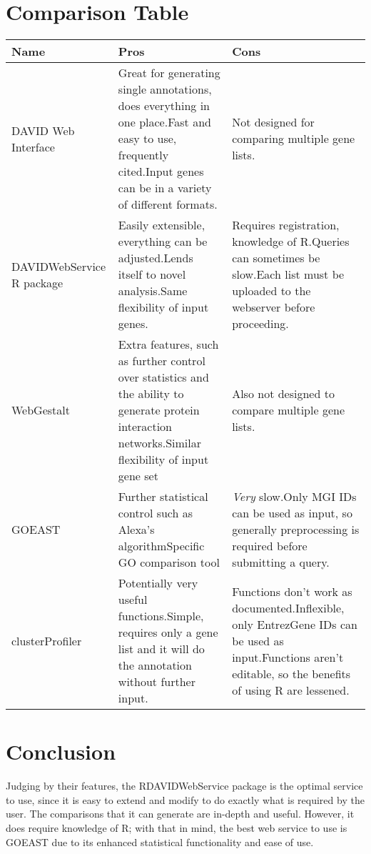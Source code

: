 \documentclass[11pt, oneside]{article}
\begin{document}
\section*{Comparison Table}
\begin{tabular}{ | p{5cm} | p{5cm} | p{5cm} |}
\hline
Name & Pros & Cons \\
\hline
DAVID Web Interface & Great for generating single annotations, does everything in one place.\newline Fast and easy to use, frequently cited.\newline Input genes can be in a variety of different formats. & Not designed for comparing multiple gene lists.\\
\hline
DAVIDWebService R package & Easily extensible, everything can be adjusted.\newline Lends itself to novel analysis.\newline Same flexibility of input genes. & Requires registration, knowledge of R.\newline Queries can sometimes be slow.\newline Each list must be uploaded to the webserver before proceeding.\\
\hline
WebGestalt & Extra features, such as further control over statistics and the ability to generate protein interaction networks.\newline Similar flexibility of input gene set & Also not designed to compare multiple gene lists.\\
\hline
GOEAST & Further statistical control such as Alexa's algorithm\newline Specific GO comparison tool & \emph{Very} slow.\newline Only MGI IDs can be used as input, so generally preprocessing is required before submitting a query.\\
\hline
clusterProfiler & Potentially very useful functions.\newline Simple, requires only a gene list and it will do the annotation without further input. & Functions don't work as documented.\newline Inflexible, only EntrezGene IDs can be used as input.\newline Functions aren't editable, so the benefits of using R are lessened.\\
\hline

\end{tabular}

\section*{Conclusion}
Judging by their features, the RDAVIDWebService package is the optimal service to use, since it is easy to extend and modify to do exactly what is required by the user. The comparisons that it can generate are in-depth and useful. However, it does require knowledge of R; with that in mind, the best web service to use is GOEAST due to its enhanced statistical functionality and ease of use. 
\end{document}
